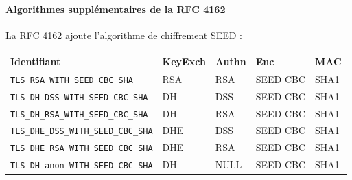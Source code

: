 \documentclass[a4paper,11pt,french]{article}
\begin{document}
\paragraph{Algorithmes supplémentaires de la RFC 4162} 
La RFC 4162 ajoute l'algorithme de chiffrement SEED :
\begin{center}
\begin{tabularx}{17cm}{|l|l|l|X|l|}
\hline
\textbf{Identifiant} & \textbf{KeyExch} & \textbf{Authn}& \textbf{Enc}& \textbf{MAC}\\
\hline
\verb+TLS_RSA_WITH_SEED_CBC_SHA+&RSA&RSA&SEED CBC&SHA1\\
\hline
\verb+TLS_DH_DSS_WITH_SEED_CBC_SHA+&DH&DSS&SEED CBC&SHA1\\
\hline 
\verb+TLS_DH_RSA_WITH_SEED_CBC_SHA+&DH&RSA&SEED CBC&SHA1\\
\hline 
\verb+TLS_DHE_DSS_WITH_SEED_CBC_SHA+&DHE&DSS&SEED CBC&SHA1\\
\hline
\verb+TLS_DHE_RSA_WITH_SEED_CBC_SHA+&DHE&RSA&SEED CBC&SHA1\\
\hline
\verb+TLS_DH_anon_WITH_SEED_CBC_SHA+ &DH&NULL&SEED CBC&SHA1\\
\hline
\end{tabularx}
\end{center}
\end{document}
